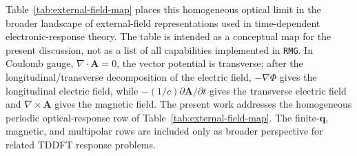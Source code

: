 Table~\ref{tab:external-field-map} places this homogeneous optical
limit in the broader landscape of external-field representations used
in time-dependent electronic-response theory.  The table is intended as
a conceptual map for the present discussion, not as a list of all
capabilities implemented in \texttt{RMG}.  In Coulomb gauge,
$\nabla\cdot\mathbf A=0$, the vector potential is transverse; after the
longitudinal/transverse decomposition of the electric field,
$-\nabla\Phi$ gives the longitudinal electric field, while
$-(1/c)\partial\mathbf A/\partial t$ gives the transverse electric field
and $\nabla\times\mathbf A$ gives the magnetic field.  The present work
addresses the homogeneous periodic optical-response row of
Table~\ref{tab:external-field-map}.  The finite-$\mathbf q$, magnetic,
and multipolar rows are included only as broader perspective for related
TDDFT response problems.\cite{Rubio-2002,Luber-rt-tddft}

